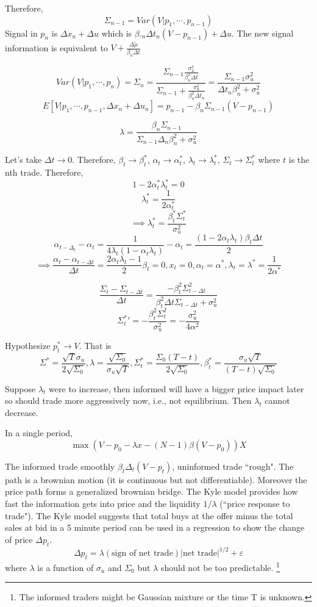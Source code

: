 \documentclass[11pt, a4paper, oneside]{article}
\theoremstyle{definition}
\theoremstyle{proposition}
\theoremstyle{corollary}
\theoremstyle{lemma}
\theoremstyle{theorem}
\begin{document}
Therefore, 
$$\Sigma_{n-1} = Var(V|p_1, \cdots, p_{n-1})$$
Signal in $p_n$ is $\Delta x_n+ \Delta u$ which is $\beta._n \Delta t_n(V - p_{n-1}) + \Delta u$. The new signal information is equivalent to $V + \frac{\Delta \tilde{\mu}}{\beta_n \Delta t}$

$$Var(V|p_1, \cdots, p_n) = \Sigma_n = \frac{\Sigma_{n-1} \frac{\sigma_u^2}{\beta_n^2 \Delta t}}{\Sigma_{n-1} + \frac{\sigma_u^2}{\beta_n^2 \Delta t_n}} = \frac{\Sigma_{n-1}\sigma_u^2}{\Delta t_n \beta_n^2 + \sigma_u^2}$$
$$E[V|p_1, \cdots, p_{n-1}, \Delta x_n + \Delta u_n] = p_{n-1} - \beta_n \Sigma_{n-1}(V - p_{n-1})$$

$$\lambda = \frac{\beta_n \Sigma_{n-1}}{\Sigma_{n-1} \Delta_n \beta_n^2 + \sigma_u^2}$$

Let's take $\Delta t \to 0$. Therefore, $\beta_t \to \beta_t^*$, $\alpha_t \to \alpha^*_t$, $\lambda_t \to \lambda_t^*$, $\Sigma_t \to \Sigma^*_t$ where $t$ is the nth trade. Therefore, 
$$1 - 2\alpha^*_t \lambda_t^* = 0$$
$$\lambda_t^* = \frac{1}{2\alpha_t^*}$$ 
$$\implies \lambda_t^* = \frac{\beta_t^*\Sigma_t^*}{\sigma_u^2}$$
$$\alpha_{t - \Delta_t} - \alpha_t = \frac{1}{4 \lambda_t(1- \alpha_t\lambda_t)} - \alpha_t = \frac{(1- 2\alpha_t \lambda_t)\beta_t \Delta t}{2}$$
$$\implies \frac{\alpha_t - \alpha_{t -\Delta t}}{\Delta t} = \frac{2\alpha_t \lambda_t - 1}{2}\beta_t = 0, x_t= 0, \alpha_t = \alpha^*, \lambda_t = \lambda^* = \frac{1}{2\alpha^*}$$

$$\frac{\Sigma_t - \Sigma_{t - \Delta t}}{\Delta t} = \frac{-\beta_t^2 \Sigma_{t -\Delta t}^2}{\beta_t^2 \Delta t \Sigma_{t -\Delta t} + \sigma_u^2}$$
$${\Sigma_t^*}' = -\frac{\beta_t^2 \Sigma_t^I}{\sigma_u^2} = -\frac{\sigma_u^2}{4\alpha^2}$$

Hypothesize $p_t^* \to V$. That is $$\Sigma^* = \frac{\sqrt{T} \sigma_u}{2\sqrt{\Sigma_0}}, \lambda = \frac{\sqrt{\Sigma_0}}{\sigma_u \sqrt{T}}, \Sigma_t^* = \frac{\Sigma_0(T - t)}{2\sqrt{\Sigma_0}}, \beta_t^* = \frac{\sigma_u \sqrt{T}}{(T - t)\sqrt{\Sigma_0}}$$ 

Suppose $\lambda_t$ were to increase, then informed will have a bigger price impact later so should trade more aggressively now, i.e., not equilibrium. Then $\lambda_t$ cannot decrease. 

In a single period, 
$$\max (V - p_0 - \lambda x - (N-1)\beta(V - p_0)) X$$

The informed trade smoothly $\beta_t\Delta_t(V - p_t)$, uninformed trade ``rough". The path is a brownian motion (it is continuous but not differentiable). Moreover the price path forms a generalized brownian bridge. The Kyle model provides how fast the information gets into price and the liquidity $1/\lambda$ (``price response to trade"). The Kyle model suggests that total buys at the offer minus the total sales at bid in a 5 minute period can be used in a regression to show the change of price $\Delta p_t$. 
$$\Delta p_t = \lambda (\text{sign of net trade})\left|\text{net trade}\right|^{1/2} + \varepsilon$$
where $\lambda$ is a function of $\sigma_u$ and $\Sigma_0$ but $\lambda$ should not be too predictable. \footnote{The informed traders might be Gaussian mixture or the time T is unknown.}
\end{document}
